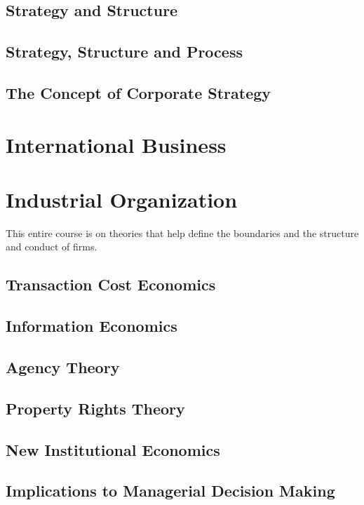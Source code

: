 \documentclass[12pt,letterpaper]{article}
\begin{document}
\subsection{Strategy and Structure}
\subsection{Strategy, Structure and Process}
\subsection{The Concept of Corporate Strategy}

\newpage

\section{International Business}

\newpage

\section{Industrial Organization}
This entire course is on theories that help define the boundaries and the structure and conduct of firms.
\subsection{Transaction Cost Economics}
\subsection{Information Economics}
\subsection{Agency Theory}
\subsection{Property Rights Theory}
\subsection{New Institutional Economics}
\subsection{Implications to Managerial Decision Making}
\end{document}
